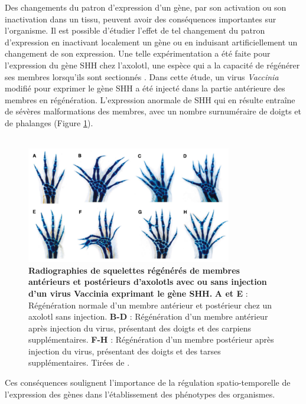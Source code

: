 Des changements du patron d’expression d’un gène, par son activation ou son inactivation dans un tissu, peuvent avoir des conséquences importantes sur l’organisme. Il est possible d'étudier l’effet de tel changement du patron d’expression en inactivant localement un gène ou en induisant artificiellement un changement de son expression. Une telle expérimentation a été faite pour l’expression du gène \acrshort{SHH} chez l’axolotl, une espèce qui a la capacité de régénérer ses membres lorsqu’ils sont sectionnés \citep{roy_vaccinia_2000}. Dans cette étude, un virus \textit{Vaccinia} modifié pour exprimer le gène \acrshort{SHH} a été injecté dans la partie antérieure des membres en régénération. L’expression anormale de \acrshort{SHH} qui en résulte entraîne de sévères malformations des membres, avec un nombre surnuméraire de doigts et de phalanges (Figure \ref{fig:Fig3}). \\
\\

\begin{figure}[h]
 \centering
 \includegraphics[width=0.8\textwidth, page=1] {figures/introduction/fig3.png}
 \caption[Radiographies de squelettes régénérés de membres antérieurs et postérieurs d'axolotls avec ou sans injection d'un virus Vaccinia exprimant le gène \acrshort{SHH}.]{
 \textbf{Radiographies de squelettes régénérés de membres antérieurs et postérieurs d'axolotls avec ou sans injection d'un virus Vaccinia exprimant le gène \acrshort{SHH}.} \textbf{A et E} : Régénération normale d'un membre antérieur et postérieur chez un axolotl sans injection. \textbf{B-D} : Régénération d'un membre antérieur après injection du virus, présentant des doigts et des carpiens supplémentaires. \textbf{F-H} : Régénération d'un membre postérieur après injection du virus, présentant des doigts et des tarses supplémentaires. Tirées de \citet{roy_vaccinia_2000}.\\
 }
 \label{fig:Fig3}
\end{figure} 

Ces conséquences soulignent l’importance de la régulation spatio-temporelle de l’expression des gènes dans l'établissement des phénotypes des organismes.
